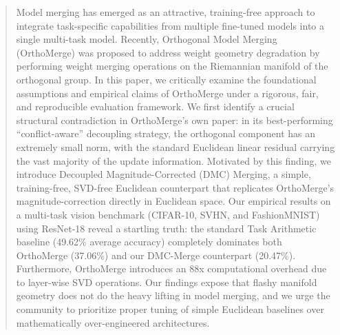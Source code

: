 \documentclass{article}
\begin{document}

\printAffiliationsAndNotice{}  %

\begin{abstract}
Model merging has emerged as an attractive, training-free approach to integrate task-specific capabilities from multiple fine-tuned models into a single multi-task model. Recently, Orthogonal Model Merging (OrthoMerge) was proposed to address weight geometry degradation by performing weight merging operations on the Riemannian manifold of the orthogonal group. In this paper, we critically examine the foundational assumptions and empirical claims of OrthoMerge under a rigorous, fair, and reproducible evaluation framework. We first identify a crucial structural contradiction in OrthoMerge's own paper: in its best-performing ``conflict-aware'' decoupling strategy, the orthogonal component has an extremely small norm, with the standard Euclidean linear residual carrying the vast majority of the update information. Motivated by this finding, we introduce Decoupled Magnitude-Corrected (DMC) Merging, a simple, training-free, SVD-free Euclidean counterpart that replicates OrthoMerge's magnitude-correction directly in Euclidean space. Our empirical results on a multi-task vision benchmark (CIFAR-10, SVHN, and FashionMNIST) using ResNet-18 reveal a startling truth: the standard Task Arithmetic baseline (49.62\% average accuracy) completely dominates both OrthoMerge (37.06\%) and our DMC-Merge counterpart (20.47\%). Furthermore, OrthoMerge introduces an 88x computational overhead due to layer-wise SVD operations. Our findings expose that flashy manifold geometry does not do the heavy lifting in model merging, and we urge the community to prioritize proper tuning of simple Euclidean baselines over mathematically over-engineered architectures.
\end{abstract}
\end{document}
